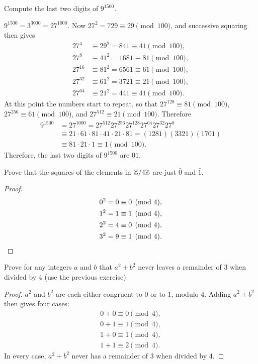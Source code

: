  Compute the last two digits of $9^{1500}$.
\begin{solution}
  $9^{1500} = 3^{3000} = 27^{1000}$. Now
  $27^2 = 729\equiv29\pmod{100}$, and successive squaring then gives
  \begin{align*}
    27^4 &\equiv 29^2 = 841 \equiv 41\pmod{100}, \\
    27^8 &\equiv 41^2 = 1681 \equiv 81\pmod{100}, \\
    27^{16} &\equiv 81^2 = 6561 \equiv 61\pmod{100}, \\
    27^{32} &\equiv 61^2 = 3721 \equiv 21\pmod{100}, \\
    27^{64} &\equiv 21^2 = 441 \equiv 41\pmod{100}.
  \end{align*}
  At this point the numbers start to repeat, so that
  $27^{128} \equiv 81\pmod{100}$, $27^{256} \equiv 61\pmod{100}$, and
  $27^{512}\equiv 21\pmod{100}$. Therefore
  \begin{align*}
    9^{1500} &= 27^{1000} = 27^{512}27^{256}27^{128}27^{64}27^{32}27^8 \\
             &\equiv 21\cdot61\cdot81\cdot41\cdot21\cdot81
               = (1281)(3321)(1701) \\
             &\equiv 81\cdot21\cdot1 \equiv 1 \pmod{100}.
  \end{align*}
  Therefore, the last two digits of $9^{1500}$ are $01$.
\end{solution}

 Prove that the squares of the elements in $\mathbb{Z}/4\mathbb{Z}$ are just
$\bar0$ and $\bar1$.
\begin{proof}
  \begin{align*}
    0^2 &= 0 \equiv 0 \pmod4, \\
    1^2 &= 1 \equiv 1 \pmod4, \\
    2^2 &= 4 \equiv 0 \pmod4, \\
    3^2 &= 9 \equiv 1 \pmod4. \qedhere
  \end{align*}
\end{proof}

 Prove for any integers $a$ and $b$ that $a^2 + b^2$ never
leaves a remainder of $3$ when divided by $4$ (use the previous
exercise).
\begin{proof}
  $a^2$ and $b^2$ are each either congruent to $0$ or to $1$, modulo
  $4$. Adding $a^2 + b^2$ then gives four cases:
  \begin{align*}
    0 + 0 \equiv 0 \pmod4, \\
    0 + 1 \equiv 1 \pmod4, \\
    1 + 0 \equiv 1 \pmod4, \\
    1 + 1 \equiv 2 \pmod4.
  \end{align*}
  In every case, $a^2+b^2$ never has a remainder of $3$ when divided
  by $4$.
\end{proof}

